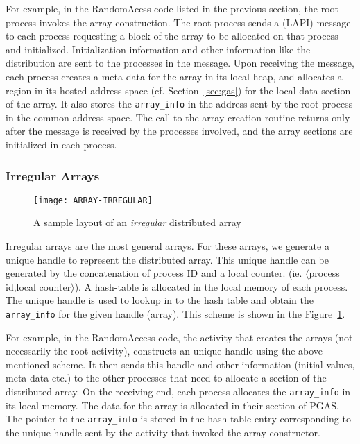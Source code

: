 For example, in the RandomAcess code listed in the previous section, the root process
invokes the array construction. The root process sends
a (LAPI) message to each process requesting a block of the array to be allocated
on that process and initialized. Initialization information and other information like the distribution are sent to the
processes in the message. 
Upon receiving the message, each process creates a meta-data for the array
in its local heap, and allocates a region in its hosted address space (cf. Section~\ref{sec:gas})
for the local data section of the array. It also stores the {\tt array\_info}
in the address sent by the root process in the common address space. 
The call to the array creation routine returns only after the message
is received by the processes involved, and the array sections are initialized
in each process. 

\subsubsection{Irregular Arrays}

\begin{figure}
\center
\texttt{[image: ARRAY-IRREGULAR]}
\caption{A sample layout of an {\em irregular} distributed array}
\label{fig:array_layout_irregular}
\end{figure}

Irregular arrays are the most general arrays. For these arrays, we generate
a unique handle to represent the distributed array. This unique handle
can be generated by the concatenation of process ID and a local counter.
(ie. $\langle$process id,local counter$\rangle$). A hash-table is allocated
in the local memory of each process. The unique handle is used to lookup in to
the hash table and obtain the {\tt array\_info} for the given handle (array). 
This scheme is shown in the Figure~\ref{fig:array_layout_irregular}.

For example, in the RandomAccess code, the activity that creates the 
arrays (not necessarily the root activity), constructs an unique handle
using the above mentioned scheme. It then sends this handle and other
information (initial values, meta-data etc.) to the other processes
that need to allocate a section of the distributed array. On the receiving 
end, each process allocates the {\tt array\_info} in its local memory.
The data for the array is allocated in their section of PGAS. The pointer
to the {\tt array\_info} is stored in the hash table entry corresponding
to the unique handle sent by the activity that invoked the array constructor. 

